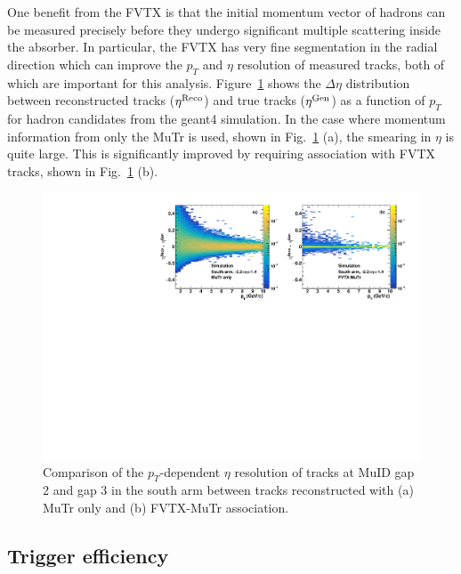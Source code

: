 \documentclass[twocolumn,letterpaper,aps,prc,longbibliography,superscriptaddress,nofootinbib,floatfix]{revtex4-2}
\newcommand{\pt}{\mbox{$p_T$}\xspace}
\newcommand{\geant}{\mbox{{\sc geant4}}\xspace}
\begin{document}
One benefit from the FVTX is that the initial momentum vector of hadrons 
can be measured precisely before they undergo significant multiple 
scattering inside the absorber. In particular, the FVTX has very fine 
segmentation in the radial direction which can improve the \pt and 
$\eta$ resolution of measured tracks, both of which are important for 
this analysis. Figure~\ref{fig:g4sim_deta} shows the $\Delta\eta$ 
distribution between reconstructed tracks ($\eta^{\rm Reco}$) and 
true tracks ($\eta^{\rm Gen}$) as a function of \pt for hadron 
candidates from the \geant simulation. In the case where momentum 
information from only the MuTr is used, shown in 
Fig.~\ref{fig:g4sim_deta} (a), the smearing in $\eta$ is quite large.  
This is significantly improved by requiring association with FVTX 
tracks, shown in Fig.~\ref{fig:g4sim_deta} (b).

\begin{figure}[thb]
\includegraphics[width=0.998\linewidth]{G4sim_deta_vs_pT_arm0.pdf}
\caption{\label{fig:g4sim_deta}
Comparison of the \pt-dependent $\eta$ resolution of tracks at MuID 
gap 2 and gap 3 in the south arm between tracks reconstructed with 
(a) MuTr only and (b) FVTX-MuTr association.}
\end{figure}

\subsection{Trigger efficiency}
\label{sec:trigeff}
\end{document}
